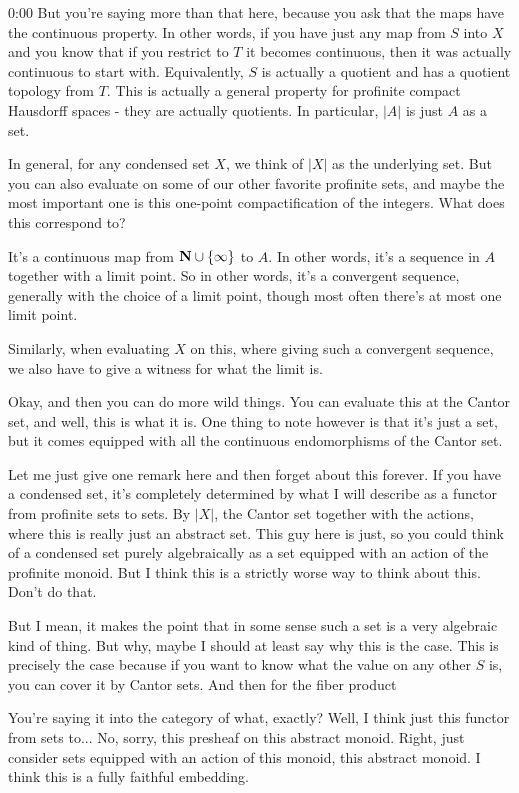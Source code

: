 \begin{unfinished}{0:00}
But you're saying more than that here, because you ask that the maps have the continuous property. In other words, if you have just any map from $S$ into $X$ and you know that if you restrict to $T$ it becomes continuous, then it was actually continuous to start with. Equivalently, $S$ is actually a quotient and has a quotient topology from $T$. This is actually a general property for profinite compact Hausdorff spaces - they are actually quotients. In particular, $|A|$ is just $A$ as a set.

In general, for any condensed set $X$, we think of $|X|$ as the underlying set. But you can also evaluate on some of our other favorite profinite sets, and maybe the most important one is this one-point compactification of the integers. What does this correspond to?

It's a continuous map from $\mathbf N \cup \{\infty\}$ to $A$. In other words, it's a sequence in $A$ together with a limit point. So in other words, it's a convergent sequence, generally with the choice of a limit point, though most often there's at most one limit point. 

Similarly, when evaluating $X$ on this, where giving such a convergent sequence, we also have to give a witness for what the limit is.

Okay, and then you can do more wild things. You can evaluate this at the Cantor set, and well, this is what it is. One thing to note however is that it's just a set, but it comes equipped with all the continuous endomorphisms of the Cantor set.

Let me just give one remark here and then forget about this forever. If you have a condensed set, it's completely determined by what I will describe as a functor from profinite sets to sets. By $|X|$, the Cantor set together with the actions, where this is really just an abstract set. This guy here is just, so you could think of a condensed set purely algebraically as a set equipped with an action of the profinite monoid. But I think this is a strictly worse way to think about this. Don't do that.

But I mean, it makes the point that in some sense such a set is a very algebraic kind of thing. But why, maybe I should at least say why this is the case. This is precisely the case because if you want to know what the value on any other $S$ is, you can cover it by Cantor sets. And then for the fiber product

You're saying it into the category of what, exactly? Well, I think just this functor from sets to... No, sorry, this presheaf on this abstract monoid. Right, just consider sets equipped with an action of this monoid, this abstract monoid. I think this is a fully faithful embedding.


\end{unfinished}
